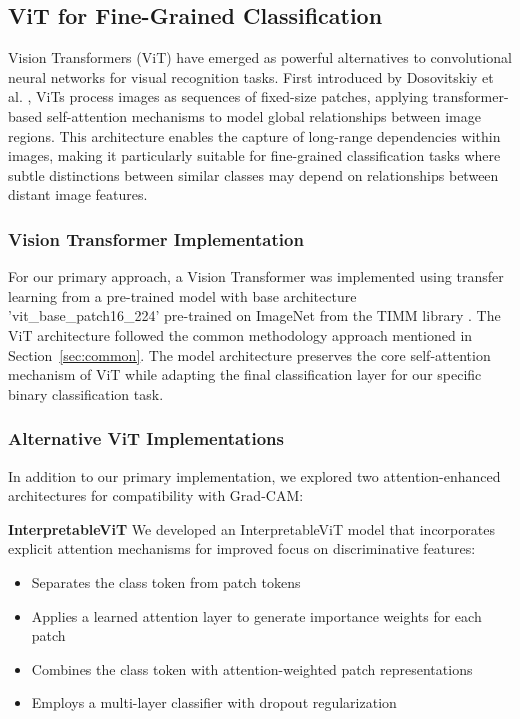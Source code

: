\documentclass[a4paper,12pt]{report}
\begin{document}
\subsection{ViT for Fine-Grained Classification}

Vision Transformers (ViT) have emerged as powerful alternatives to convolutional neural networks for visual recognition tasks. First introduced by Dosovitskiy et al. \citep{dosovitskiy2021imageworth16x16words}, ViTs process images as sequences of fixed-size patches, applying transformer-based self-attention mechanisms to model global relationships between image regions. This architecture enables the capture of long-range dependencies within images, making it particularly suitable for fine-grained classification tasks where subtle distinctions between similar classes may depend on relationships between distant image features.

\subsubsection{Vision Transformer Implementation}

For our primary approach, a Vision Transformer was implemented using transfer learning from a pre-trained model with base architecture 'vit\_base\_patch16\_224' pre-trained on ImageNet from the TIMM library \citep{rwightman2021pytorch}. The ViT architecture followed the common methodology approach mentioned in Section~\ref{sec:common}. The model architecture preserves the core self-attention mechanism of ViT while adapting the final classification layer for our specific binary classification task.

\subsubsection{Alternative ViT Implementations}

In addition to our primary implementation, we explored two attention-enhanced architectures for compatibility with Grad-CAM:

\textbf{InterpretableViT}
We developed an InterpretableViT model that incorporates explicit attention mechanisms for improved focus on discriminative features:

\begin{itemize}
    \item Separates the class token from patch tokens
    \item Applies a learned attention layer to generate importance weights for each patch
    \item Combines the class token with attention-weighted patch representations
    \item Employs a multi-layer classifier with dropout regularization
\end{itemize}
\end{document}
